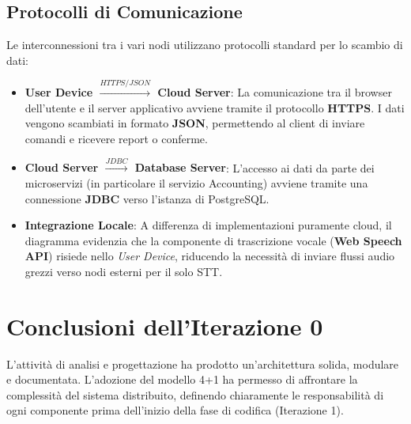 \subsection{Protocolli di Comunicazione}
Le interconnessioni tra i vari nodi utilizzano protocolli standard per lo scambio di dati:

\begin{itemize}
    \item \textbf{User Device $\xrightarrow{HTTPS/JSON}$ Cloud Server}: La comunicazione tra il browser dell'utente e il server applicativo avviene tramite il protocollo \textbf{HTTPS}. I dati vengono scambiati in formato \textbf{JSON}, permettendo al client di inviare comandi e ricevere report o conferme.

    \item \textbf{Cloud Server $\xrightarrow{JDBC}$ Database Server}: L'accesso ai dati da parte dei microservizi (in particolare il servizio Accounting) avviene tramite una connessione \textbf{JDBC} verso l'istanza di PostgreSQL.

    \item \textbf{Integrazione Locale}: A differenza di implementazioni puramente cloud, il diagramma evidenzia che la componente di trascrizione vocale (\textbf{Web Speech API}) risiede nello \textit{User Device}, riducendo la necessità di inviare flussi audio grezzi verso nodi esterni per il solo STT.
\end{itemize}

\section{Conclusioni dell'Iterazione 0}

L'attività di analisi e progettazione ha prodotto un'architettura solida, modulare e documentata. L'adozione del modello 4+1 ha permesso di affrontare la complessità del sistema distribuito, definendo chiaramente le responsabilità di ogni componente prima dell'inizio della fase di codifica (Iterazione 1).